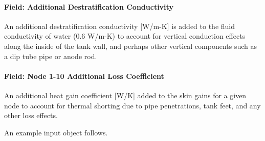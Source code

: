 \paragraph{Field: Additional Destratification
Conductivity}\label{field-additional-destratification-conductivity-thermalstoragehotwaterstratified}

An additional destratification conductivity {[}W/m-K{]} is added to the fluid
conductivity of water (0.6 W/m-K) to account for vertical conduction effects
along the inside of the tank wall, and perhaps other vertical components such as
a dip tube pipe or anode rod.

\paragraph{Field: Node 1-10 Additional Loss
Coefficient}\label{field-node-1-10-additional-loss-coefficient-thermalstoragehotwaterstratified}

An additional heat gain coefficient {[}W/K{]} added to the skin gains for a
given node to account for thermal shorting due to pipe penetrations, tank feet,
and any other loss effects.

An example input object follows.

